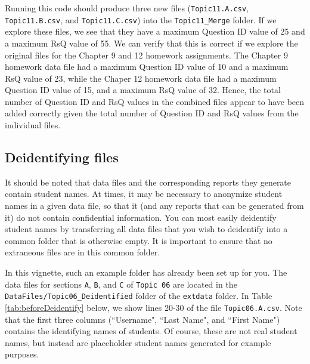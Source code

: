 \documentclass{article}\usepackage[]{graphicx}\usepackage[]{color}
\numberwithin{equation}{section} %
\begin{document}
Running this code should produce three new files (\texttt{Topic11.A.csv}, \texttt{Topic11.B.csv}, and \texttt{Topic11.C.csv}) into the \texttt{Topic11\_Merge} folder. If we explore these files, we see that they have a maximum Question ID value of 25 and a maximum RsQ value of 55. We can verify that this is correct if we explore the original files for the Chapter 9 and 12 homework assignments. The Chapter 9 homework data file had a maximum Question ID value of 10 and a maximum RsQ value of 23, while the Chaper 12 homework data file had a maximum Question ID value of 15, and a maximum RsQ value of 32. Hence, the total number of Question ID and RsQ values in the combined files appear to have been added correctly given the total number of Question ID and RsQ values from the individual files.

\subsection{Deidentifying files}

It should be noted that data files and the corresponding reports they generate contain student names. At times, it may be necessary to anonymize student names in a given data file, so that it (and any reports that can be generated from it) do not contain confidential information. You can most easily deidentify student names by transferring all data files that you wish to deidentify into a common folder that is otherwise empty. It is important to ensure that no extraneous files are in this common folder.

In this vignette, such an example folder has already been set up for you. The data files for sections \texttt{A}, \texttt{B}, and \texttt{C} of \texttt{Topic 06} are located in the \texttt{DataFiles/Topic06\_Deidentified} folder of the \texttt{extdata} folder. In Table \ref{tab:beforeDeidentify} below, we show lines 20-30 of the file \texttt{Topic06.A.csv}. Note that the first three columns (``Username", ``Last Name", and ``First Name") contains the identifying names of students. Of course, these are not real student names, but instead are placeholder student names generated for example purposes. \\
\end{document}

